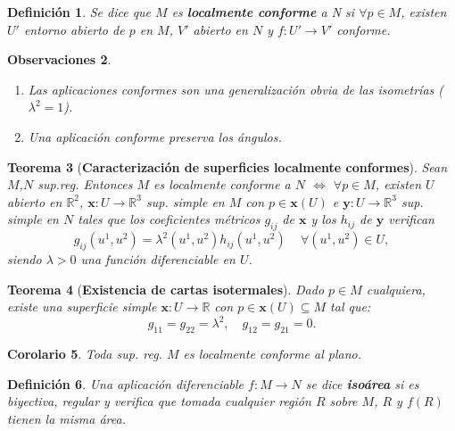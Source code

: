 \documentclass[ebook,oneside]{memoir}
\newtheorem{thm}{Teorema}[chapter]
\newtheorem{coro}[thm]{Corolario}
\newtheorem{defn}[thm]{Definición}
\newtheorem{rem}[thm]{Observaciones}
\begin{document}
\begin{defn}
Se dice que $M$ es \textbf{localmente conforme} a N si $\forall p \in M$, existen $U'$ entorno abierto de $p$ en $M$, $V'$ abierto en $N$ y $f: U' \rightarrow V'$ conforme.
\end{defn}

\begin{rem}

\

\begin{enumerate}
\item Las aplicaciones conformes son una generalizaci\'on obvia de las isometr\'ias ($\lambda^2=1$).
\item Una aplicaci\'on conforme preserva los \'angulos.
\end{enumerate}
\end{rem}

\begin{thm}[\textbf{Caracterizaci\'on de superficies localmente conformes}]
Sean $M$,$N$ sup.reg. Entonces $M$ es localmente conforme a $N$ $\Leftrightarrow$ $\forall p \in M$, existen $U$ abierto en $\mathbb{R}^2$, $\textbf{x}: U\rightarrow \mathbb{R}^3$ sup. simple en $M$ con $p\in \textbf{x}(U)$ e $\textbf{y}: U\rightarrow \mathbb{R}^3$ sup. simple en $N$ tales que los coeficientes m\'etricos $g_{ij}$ de $\textbf{x}$ y los $h_{ij}$ de $\textbf{y}$ verifican
$$ g_{ij}(u^1,u^2) = \lambda^2(u^1,u^2)h_{ij}(u^1,u^2) \, \, \, \, \, \, \, \forall (u^1,u^2)\in U,$$
siendo $\lambda > 0$ una funci\'on diferenciable en $U$.

\end{thm}

\begin{thm}[\textbf{Existencia de cartas isotermales}]
Dado $p \in M$ cualquiera, existe una superficie simple $\textbf{x}: U\longrightarrow \mathbb{R}$ con $ p\in \textbf{x}(U) \subseteq M $ tal que:
$$g_{11}= g_{22}= \lambda^2, \quad g_{12}=g_{21}=0.$$
\end{thm}

\begin{coro}
Toda sup. reg. $M$ es localmente conforme al plano.
\end{coro}

\begin{defn}
Una aplicaci\'on diferenciable $ f: M\longrightarrow N$ se dice \textbf{iso\'area} si es biyectiva, regular y verifica que tomada cualquier regi\'on $R$ sobre $M$, $R$ y $f(R)$ tienen la misma \'area.
\end{defn}
\end{document}
